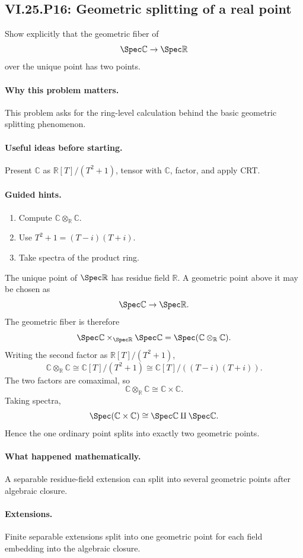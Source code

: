 \subsection*{VI.25.P16: Geometric splitting of a real point}
\begin{problem}\label{prob:vi25-p16}
Show explicitly that the geometric fiber of
\[
\Spec\mathbb C\to\Spec\mathbb R
\]
over the unique point has two points.
\end{problem}

\ifdefined\FullProblemDossiers
\paragraph{Why this problem matters.}
This problem asks for the ring-level calculation behind the basic geometric splitting phenomenon.

\paragraph{Useful ideas before starting.}
Present \(\mathbb C\) as \(\mathbb R[T]/(T^2+1)\), tensor with \(\mathbb C\), factor, and apply CRT.

\paragraph{Guided hints.}
\begin{enumerate}
\item Compute \(\mathbb C\otimes_{\mathbb R}\mathbb C\).
\item Use \(T^2+1=(T-i)(T+i)\).
\item Take spectra of the product ring.
\end{enumerate}

\begin{solution}
The unique point of \(\Spec\mathbb R\) has residue field \(\mathbb R\).  A geometric point above it may be chosen as
\[
\Spec\mathbb C\to\Spec\mathbb R.
\]
The geometric fiber is therefore
\[
\Spec\mathbb C\times_{\Spec\mathbb R}\Spec\mathbb C
=
\Spec(\mathbb C\otimes_{\mathbb R}\mathbb C).
\]
Writing the second factor as \(\mathbb R[T]/(T^2+1)\),
\[
\mathbb C\otimes_{\mathbb R}\mathbb C
\cong
\mathbb C[T]/(T^2+1)
\cong
\mathbb C[T]/((T-i)(T+i)).
\]
The two factors are comaximal, so
\[
\mathbb C\otimes_{\mathbb R}\mathbb C
\cong
\mathbb C\times\mathbb C.
\]
Taking spectra,
\[
\Spec(\mathbb C\times\mathbb C)
\cong
\Spec\mathbb C\amalg\Spec\mathbb C.
\]
Hence the one ordinary point splits into exactly two geometric points.
\end{solution}

\paragraph{What happened mathematically.}
A separable residue-field extension can split into several geometric points after algebraic closure.

\paragraph{Extensions.}
Finite separable extensions split into one geometric point for each field embedding into the algebraic closure.
\fi
